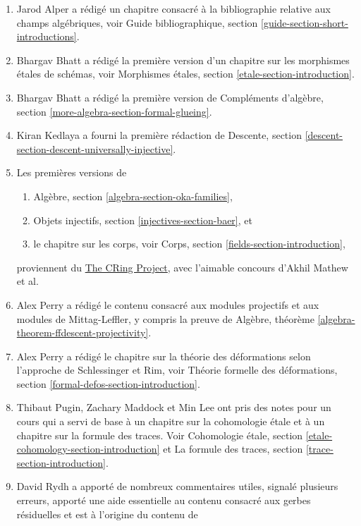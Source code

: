 \begin{enumerate}
\item Jarod Alper a rédigé un chapitre consacré à la bibliographie relative
aux champs algébriques, voir
Guide bibliographique, section \ref{guide-section-short-introductions}.
\item Bhargav Bhatt a r\'edig\'e la premi\`ere version d'un chapitre
sur les morphismes \'etales de sch\'emas, voir
Morphismes \'etales, section \ref{etale-section-introduction}.
\item Bhargav Bhatt a r\'edig\'e la premi\`ere version de
Compl\'ements d'alg\`ebre, section \ref{more-algebra-section-formal-glueing}.
\item Kiran Kedlaya a fourni la premi\`ere r\'edaction de
Descente, section \ref{descent-section-descent-universally-injective}.
\item Les premi\`eres versions de
\begin{enumerate}
\item Alg\`ebre, section \ref{algebra-section-oka-families},
\item Objets injectifs, section \ref{injectives-section-baer}, et
\item le chapitre sur les corps, voir
Corps, section \ref{fields-section-introduction},
\end{enumerate}
proviennent du
\href{https://math.uchicago.edu/~amathew/cr.html}{The CRing Project},
avec l'aimable concours d'Akhil Mathew et al.
\item Alex Perry a r\'edig\'e le contenu consacr\'e aux modules projectifs
et aux modules de Mittag-Leffler, y compris la preuve de
Alg\`ebre, th\'eor\`eme \ref{algebra-theorem-ffdescent-projectivity}.
\item Alex Perry a r\'edig\'e le chapitre sur la th\'eorie des d\'eformations
selon l'approche de Schlessinger et Rim, voir
Th\'eorie formelle des d\'eformations, section \ref{formal-defos-section-introduction}.
\item Thibaut Pugin, Zachary Maddock et Min Lee ont pris des notes pour un
cours qui a servi de base \`a un chapitre sur la cohomologie \'etale
et \`a un chapitre sur la formule des traces. Voir
Cohomologie \'etale, section \ref{etale-cohomology-section-introduction}
et
La formule des traces, section \ref{trace-section-introduction}.
\item David Rydh a apport\'e de nombreux commentaires utiles, signal\'e plusieurs
erreurs, apport\'e une aide essentielle au contenu consacr\'e aux gerbes r\'esiduelles
et est \`a l'origine du contenu de

\end{enumerate}
